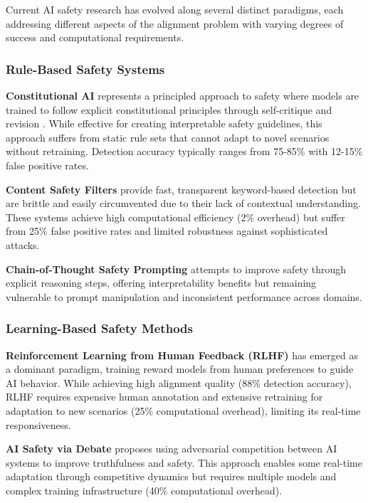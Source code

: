 \documentclass[12pt]{article}
\begin{document}
Current AI safety research has evolved along several distinct paradigms, each addressing different aspects of the alignment problem with varying degrees of success and computational requirements.

\subsubsection{Rule-Based Safety Systems}

\textbf{Constitutional AI} represents a principled approach to safety where models are trained to follow explicit constitutional principles through self-critique and revision \cite{bai2022constitutional}. While effective for creating interpretable safety guidelines, this approach suffers from static rule sets that cannot adapt to novel scenarios without retraining. Detection accuracy typically ranges from 75-85\% with 12-15\% false positive rates.

\textbf{Content Safety Filters} \cite{gehman2020realtoxicityprompts} provide fast, transparent keyword-based detection but are brittle and easily circumvented due to their lack of contextual understanding. These systems achieve high computational efficiency (2\% overhead) but suffer from 25\% false positive rates and limited robustness against sophisticated attacks.

\textbf{Chain-of-Thought Safety Prompting} \cite{wei2022chain} attempts to improve safety through explicit reasoning steps, offering interpretability benefits but remaining vulnerable to prompt manipulation and inconsistent performance across domains.

\subsubsection{Learning-Based Safety Methods}

\textbf{Reinforcement Learning from Human Feedback (RLHF)} \cite{ouyang2022training} has emerged as a dominant paradigm, training reward models from human preferences to guide AI behavior. While achieving high alignment quality (88\% detection accuracy), RLHF requires expensive human annotation and extensive retraining for adaptation to new scenarios (25\% computational overhead), limiting its real-time responsiveness.

\textbf{AI Safety via Debate} \cite{irving2018ai} proposes using adversarial competition between AI systems to improve truthfulness and safety. This approach enables some real-time adaptation through competitive dynamics but requires multiple models and complex training infrastructure (40\% computational overhead).
\end{document}
